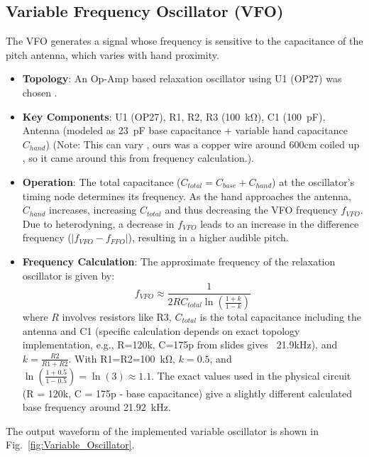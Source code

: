 \documentclass[conference]{IEEEtran}
\begin{document}
\subsection{Variable Frequency Oscillator (VFO)}
The VFO generates a signal whose frequency is sensitive to the capacitance of the pitch antenna, which varies with hand proximity.
\begin{itemize}
    \item \textbf{Topology}: An Op-Amp based relaxation oscillator using U1 (OP27) was chosen \cite{relax_osc}.
    \item \textbf{Key Components}: U1 (OP27), R1, R2, R3 (\SI{100}{\kilo\ohm}), C1 (\SI{100}{\pico\farad}), Antenna (modeled as \SI{23}{\pico\farad} base capacitance + variable hand capacitance $C_{hand}$) (Note: This can vary , ours was a copper wire around 600cm coiled up , so it came around this from frequency calculation.).
    \item \textbf{Operation}: The total capacitance ($C_{total} = C_{base} + C_{hand}$) at the oscillator's timing node determines its frequency. As the hand approaches the antenna, $C_{hand}$ increases, increasing $C_{total}$ and thus decreasing the VFO frequency $f_{VFO}$. Due to heterodyning, a decrease in $f_{VFO}$ leads to an increase in the difference frequency ($|f_{VFO} - f_{FFO}|$), resulting in a higher audible pitch.
    \item \textbf{Frequency Calculation}: The approximate frequency of the relaxation oscillator is given by:
        \begin{equation}
            f_{VFO} \approx \frac{1}{2 R C_{total} \ln\left(\frac{1+k}{1-k}\right)}
        \end{equation}
        where $R$ involves resistors like R3, $C_{total}$ is the total capacitance including the antenna and C1 (specific calculation depends on exact topology implementation, e.g., R=120k, C=175p from slides gives ~21.9kHz), and $k = \frac{R2}{R1+R2}$. With R1=R2=\SI{100}{\kilo\ohm}, $k=0.5$, and $\ln(\frac{1+0.5}{1-0.5}) = \ln(3) \approx 1.1$. The exact values used in the physical circuit (R = 120k, C = 175p - base capacitance) give a slightly different calculated base frequency around \SI{21.92}{\kilo\hertz}.
\end{itemize}
The output waveform of the implemented variable oscillator is shown in Fig.~\ref{fig:Variable_Oscillator}.
\end{document}
